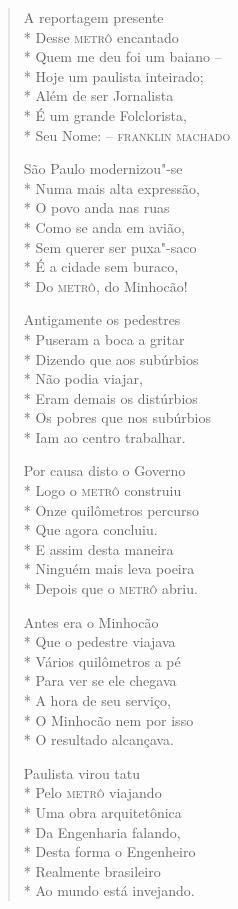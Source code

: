 \begin{verse}
A reportagem presente\\*
Desse \textsc{metrô} encantado\\*
Quem me deu foi um baiano --\\*
Hoje um paulista inteirado;\\*
Além de ser Jornalista\\*
É um grande Folclorista,\\*
Seu Nome: --  \textsc{franklin machado}

São Paulo modernizou"-se\\*
Numa mais alta expressão,\\*
O povo anda nas ruas\\*
Como se anda em avião,\\*
Sem querer ser puxa"-saco\\*
É a cidade sem buraco,\\*
Do \textsc{metrô}, do Minhocão!

Antigamente os pedestres\\*
Puseram a boca a gritar\\*
Dizendo que aos subúrbios\\*
Não podia viajar,\\*
Eram demais os distúrbios\\*
Os pobres que nos subúrbios\\*
Iam ao centro trabalhar.

Por causa disto o Governo\\*
Logo o \textsc{metrô} construiu\\*
Onze quilômetros percurso\\*
Que agora concluiu.\\*
E assim desta maneira\\*
Ninguém mais leva poeira\\*
Depois que o \textsc{metrô} abriu.

Antes era o Minhocão\\*
Que o pedestre viajava\\*
Vários quilômetros a pé\\*
Para ver se ele chegava\\*
A hora de seu serviço,\\*
O Minhocão nem por isso\\*
O resultado alcançava.

Paulista virou tatu\\*
Pelo \textsc{metrô} viajando\\*
Uma obra arquitetônica\\*
Da Engenharia falando,\\*
Desta forma o Engenheiro\\*
Realmente brasileiro\\*
Ao mundo está invejando.


\end{verse}
